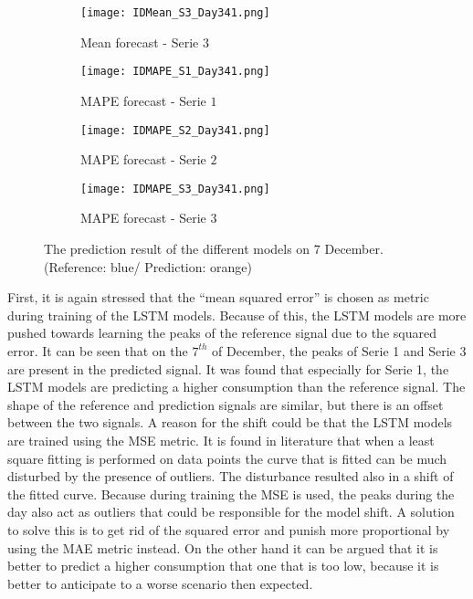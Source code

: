 \begin{figure}[ht]
	\begin{subfigure}{0.32\textwidth}
		\texttt{[image: IDMean\_S3\_Day341.png]}
		\caption{Mean forecast - Serie $ 3 $}
	\end{subfigure}
	 \begin{subfigure}{0.32\textwidth}
		\texttt{[image: IDMAPE\_S1\_Day341.png]}
		\caption{MAPE forecast - Serie $ 1 $}
	\end{subfigure}	 	
	\begin{subfigure}{0.32\textwidth}
		\texttt{[image: IDMAPE\_S2\_Day341.png]}
		\caption{MAPE forecast - Serie $ 2 $}
	\end{subfigure}	
	\begin{subfigure}{0.32\textwidth}
		\texttt{[image: IDMAPE\_S3\_Day341.png]}
		\caption{MAPE forecast - Serie $ 3 $}
	\end{subfigure}
 	\caption{The prediction result of the different models on $ 7 $ December. (Reference: blue/ Prediction: orange)}
 	\label{fig:individual_forecasts}
 \end{figure}


First, it is again stressed that the ``mean squared error'' is chosen as metric during training of the LSTM models. Because of this, the LSTM models are more pushed towards learning the peaks of the reference signal due to the squared error. It can be seen that on the $ 7^{th} $ of December, the peaks of Serie 1 and Serie 3 are present in the predicted signal. It was found that especially for Serie 1, the LSTM models are predicting a higher consumption than the reference signal. The shape of the reference and prediction signals are similar, but there is an offset between the two signals. A reason for the shift could be that the LSTM models are trained using the MSE metric. It is found in literature that when a least square fitting is performed on data points the curve that is fitted can be much disturbed by the presence of outliers. The disturbance resulted also in a shift of the fitted curve. Because during training the MSE is used, the peaks during the day also act as outliers that could be responsible for the model shift. A solution to solve this is to get rid of the squared error and punish more proportional by using the MAE metric instead. On the other hand it can be argued that it is better to predict a higher consumption that one that is too low, because it is better to anticipate to a worse scenario then expected.\\

